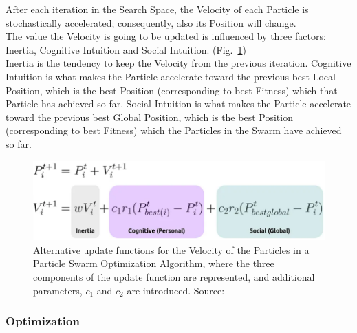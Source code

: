 After each iteration in the Search Space, the Velocity of each Particle is stochastically accelerated; consequently, also its Position will change.
\\[0.3cm]The value the Velocity is going to be updated is influenced by three factors: Inertia, Cognitive Intuition and Social Intuition. (Fig.~\ref{fig:figure-3.1.2})
\\[0.3cm]Inertia is the tendency to keep the Velocity from the previous iteration.
Cognitive Intuition is what makes the Particle accelerate toward the previous best Local Position, which is the best Position (corresponding to best Fitness) which that Particle has achieved so far.
Social Intuition is what makes the Particle accelerate toward the previous best Global Position, which is the best Position (corresponding to best Fitness) which the Particles in the Swarm have achieved so far.
\begin{figure}[t]
	\centering
	\includegraphics[width=13cm]{figures/figure-3.1.2.png}
	\caption[Alternative Update Functions for PSO]{Alternative update functions for the Velocity of the Particles in a Particle Swarm Optimization Algorithm, where the three components of the update function are represented, and additional parameters, $c_1$ and $c_2$ are introduced. Source:~\cite{Tesi-3.2}}
	\label{fig:figure-3.1.2}
\end{figure}

\subsubsection{Optimization}

